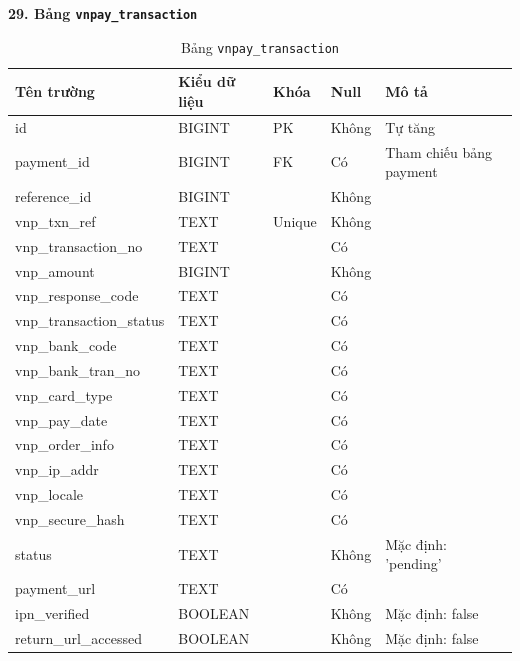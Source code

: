 \documentclass[12pt,a4paper]{report}
\begin{document}
\vspace{0.3cm}
\textbf{29. Bảng \texttt{vnpay\_transaction}}
\vspace{0.1cm}
\begin{longtable}{|>{\ttfamily}p{3.5cm}|p{2.5cm}|p{1.5cm}|p{1.5cm}|p{5cm}|}
\caption{Bảng \texttt{vnpay\_transaction}} \label{tab:db_vnpay_transaction} \\
\hline
\normalfont\textbf{Tên trường} & \textbf{Kiểu dữ liệu} & \textbf{Khóa} & \textbf{Null} & \textbf{Mô tả} \\ \hline
id & BIGINT & PK & Không & Tự tăng \\ \hline
payment\_id & BIGINT & FK & Có & Tham chiếu bảng payment \\ \hline
reference\_id & BIGINT & & Không & \\ \hline
vnp\_txn\_ref & TEXT & Unique & Không & \\ \hline
vnp\_transaction\_no & TEXT & & Có & \\ \hline
vnp\_amount & BIGINT & & Không & \\ \hline
vnp\_response\_code & TEXT & & Có & \\ \hline
vnp\_transaction\_status & TEXT & & Có & \\ \hline
vnp\_bank\_code & TEXT & & Có & \\ \hline
vnp\_bank\_tran\_no & TEXT & & Có & \\ \hline
vnp\_card\_type & TEXT & & Có & \\ \hline
vnp\_pay\_date & TEXT & & Có & \\ \hline
vnp\_order\_info & TEXT & & Có & \\ \hline
vnp\_ip\_addr & TEXT & & Có & \\ \hline
vnp\_locale & TEXT & & Có & \\ \hline
vnp\_secure\_hash & TEXT & & Có & \\ \hline
status & TEXT & & Không & Mặc định: 'pending' \\ \hline
payment\_url & TEXT & & Có & \\ \hline
ipn\_verified & BOOLEAN & & Không & Mặc định: false \\ \hline
return\_url\_accessed & BOOLEAN & & Không & Mặc định: false \\ \hline
\end{longtable}
\end{document}
